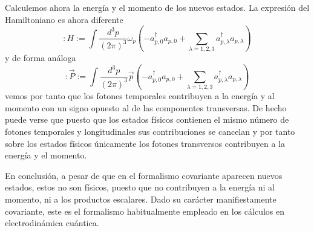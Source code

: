 Calculemos ahora la energía y el momento de los nuevos estados. La expresión del Hamiltoniano es ahora diferente
\begin{equation*}
: H:=\int \frac{d^{3} p}{(2 \pi)^{3}} \omega_{p}\left(-a_{p, 0}^{\dagger} a_{p, 0}+\sum_{\lambda=1,2,3} a_{p, \lambda}^{\dagger} a_{p, \lambda}\right) \tag{6.71}
\end{equation*}
y de forma análoga
\begin{equation*}
: \vec{P}:=\int \frac{d^{3} p}{(2 \pi)^{3}} \vec{p}\left(-a_{p, 0}^{\dagger} a_{p, 0}+\sum_{\lambda=1,2,3} a_{p, \lambda}^{\dagger} a_{p, \lambda}\right) \tag{6.72}
\end{equation*}
vemos por tanto que los fotones temporales contribuyen a la energía y al momento con un signo opuesto al de las componentes transversas. De hecho puede verse que puesto que los estados físicos contienen el mismo número de fotones temporales y longitudinales sus contribuciones se cancelan y por tanto sobre los estados físicos únicamente los fotones transversos contribuyen a la energía y el momento.

En conclusión, a pesar de que en el formalismo covariante aparecen nuevos estados, estos no son físicos, puesto que no contribuyen a la energía ni al momento, ni a los productos escalares. Dado su carácter manifiestamente covariante, este es el formalismo habitualmente empleado en los cálculos en electrodinámica cuántica.
